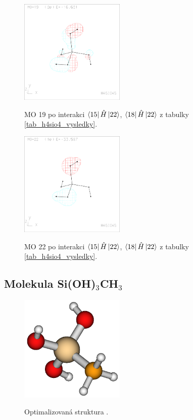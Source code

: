 \documentclass[
  digital, %
  table,   %
  lof,     %
  lot,     %
]{fithesis3}
\begin{document}
\begin{figure}[h]
\caption{MO 19 po interakci $\bra{15}{\hat{H}}\ket{22}$, $\bra{18}{\hat{H}}\ket{22}$ z tabulky \ref{tab_h4sio4_vysledky}.  }
  \center
  \includegraphics[width=5cm]{h4sio4_obrazky/s3__19.eps}
  \label{obr_h4sio4_MO_s3_19}
  \end{figure}

\begin{figure}[h]
\caption{MO 22 po interakci $\bra{15}{\hat{H}}\ket{22}$, $\bra{18}{\hat{H}}\ket{22}$ z tabulky \ref{tab_h4sio4_vysledky}.  }
  \center
  \includegraphics[width=5cm]{h4sio4_obrazky/s3__22.eps}
  \label{obr_h4sio4_MO_s3_22}
  \end{figure}
  
\subsection{Molekula Si(OH)$_3$CH$_3$}
\begin{figure}[h!]
\caption{Optimalizovaná struktura . }
  \center
  \includegraphics[width=5cm]{si(oh)3ch3_obr.png}
  \label{obr_sioh3ch3_opt_struktura}
  \end{figure}
  
\end{document}
